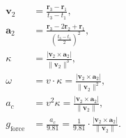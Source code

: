 \documentclass{article}
\begin{document}
	\[
	\boxed{
		\begin{aligned}
			\bm{v}_2 &= \frac{\bm{r}_3 - \bm{r}_1}{t_3 - t_1}, \\
			\bm{a}_2 &= \frac{\bm{r}_3 - 2 \bm{r}_2 + \bm{r}_1}{\left(\frac{t_3 - t_1}{2}\right)^2}, \\
			\kappa &= \frac{|\bm{v}_2 \times \bm{a}_2|}{\|\bm{v}_2\|^3}, \\
			\omega &= v \cdot \kappa = \frac{|\bm{v}_2 \times \bm{a}_2|}{\|\bm{v}_2\|^2}, \\
			a_c &= v^2 \kappa = \frac{|\bm{v}_2 \times \bm{a}_2|}{\|\bm{v}_2\|}, \\
			g_{\text{force}} &= \frac{a_c}{9.81} = \frac{1}{9.81} \cdot \frac{|\bm{v}_2 \times \bm{a}_2|}{\|\bm{v}_2\|}.
		\end{aligned}
	}
	\]
	
\end{document}
